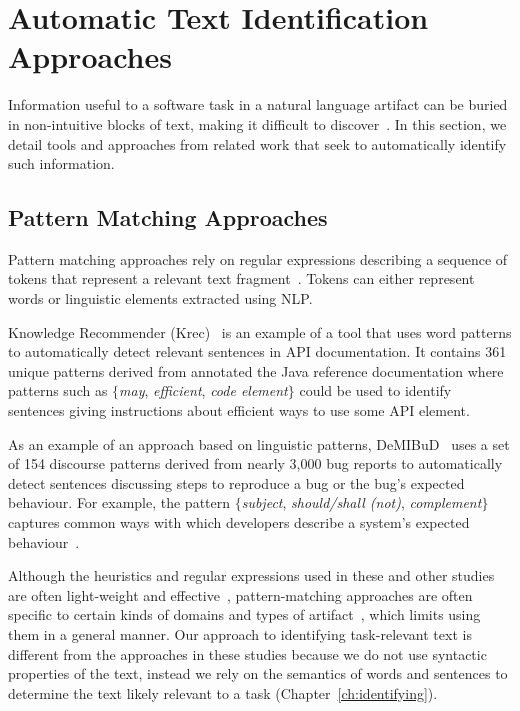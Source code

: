 \section{Automatic Text Identification Approaches}
\label{cp2:automatic-approaches}



Information useful to a software task in a natural language artifact can be buried in  
non-intuitive blocks of text, making it difficult to discover~\cite{Robillard2015}.
In this section, we detail tools and approaches from related work
that seek to automatically identify such information.





\subsection{Pattern Matching Approaches}
\label{cp2:pattern-matching}


Pattern matching approaches rely on regular expressions describing a sequence of tokens that represent
 a relevant text fragment~\cite{Bavota2016}. Tokens can either represent words or linguistic elements 
extracted using \acf{NLP}.
    

Knowledge Recommender (Krec)~\cite{Robillard2015} 
is an example of a
 tool that uses word patterns to 
 automatically detect relevant sentences in  API documentation. 
It contains 361 unique patterns derived from annotated the Java reference documentation
where patterns such as {\small \textit{$\{$may}, \textit{efficient}, \textit{code element$\}$}} could be used to identify sentences giving instructions about efficient ways to 
use some API element. 

As an example of an approach based on linguistic patterns,
{\small DeMIBuD}~\cite{Chaparro2017} uses a set of 154 discourse patterns
derived from nearly 3,000 bug reports 
to
automatically detect sentences discussing steps to reproduce 
a bug or the bug's expected behaviour.
For example, the pattern 
{\small \textit{$\{$subject}, \textit{should/shall (not)}, \textit{complement$\}$}}
captures common ways with which developers describe a system's expected behaviour~\cite{Chaparro2017}.





Although the heuristics and regular expressions used in these and other studies~\cite{nadi2020, Maalej2013}
are often light-weight and effective~\cite{Bavota2016}, 
pattern-matching approaches 
are often specific to certain kinds of domains and types of artifact~\cite{fucci2019}, which limits
using them in a general manner. 
Our approach to identifying task-relevant text 
is different from the approaches in these studies because we do not use syntactic properties of the text, 
instead we rely on the semantics 
of words and sentences to determine the text likely relevant to a task (Chapter~\ref{ch:identifying}).





